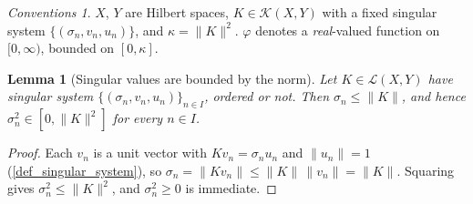 \documentclass[a4paper]{report}
\theoremstyle{plain}
\newtheorem{lemma}[theorem]{Lemma}
\theoremstyle{definition}
\theoremstyle{remark}
\newtheorem{assumptions}[theorem]{Conventions}
\begin{document}
\begin{assumptions}
  \label{asm_functions_compact_operator}
  $X$, $Y$ are Hilbert spaces,
$K \in \mathcal{K}(X,Y)$ with a fixed singular system $\{(\sigma_n,v_n,u_n)\}$, and
$\kappa = \|K\|^2$.  $\varphi$ denotes a \emph{real}-valued function on $[0,\infty)$,
bounded on $[0,\kappa]$.
\end{assumptions}



\begin{lemma}[Singular values are bounded by the norm]
  \label{lem_sigma_bound}
  Let $K \in \mathcal{L}(X,Y)$ have singular system $\{(\sigma_n,v_n,u_n)\}_{n \in I}$,
  ordered or not.  Then $\sigma_n \le \|K\|$, and hence $\sigma_n^2 \in [0,\|K\|^2]$ for
  every $n \in I$.
\end{lemma}
\begin{proof}
  Each $v_n$ is a unit vector with $Kv_n = \sigma_n u_n$ and $\|u_n\| = 1$
  (\cref{def_singular_system}), so $\sigma_n = \|Kv_n\| \le \|K\|\,\|v_n\| = \|K\|$.
  Squaring gives $\sigma_n^2 \le \|K\|^2$, and $\sigma_n^2 \ge 0$ is immediate.
\end{proof}
\end{document}
